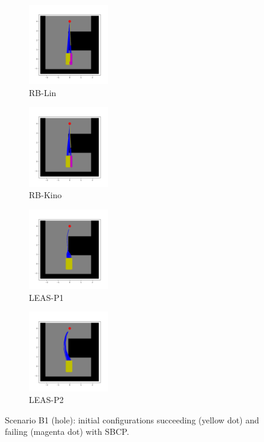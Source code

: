 \begin{figure}[ht]
    \captionsetup[subfigure]{justification=centering}
    \centering
    \begin{subfigure}[t]{0.4\linewidth}
        \includegraphics[width=\textwidth, height=3.5cm, trim={0cm 1cm 0cm 1cm},clip]{Figures/Chapter_CPSB/hole_Lin.png}
        \caption{RB-Lin}
    \end{subfigure}
    \begin{subfigure}[t]{0.4\linewidth}
        \includegraphics[width=\textwidth, height=3.5cm, trim={0cm 1cm 0cm 1cm},clip]{Figures/Chapter_CPSB/hole_Kino.png}
        \caption{RB-Kino}
    \end{subfigure}
    \begin{subfigure}[t]{0.4\linewidth}
        \includegraphics[width=\textwidth, height=3.5cm, trim={0cm 1cm 0cm 1cm},clip]{Figures/Chapter_CPSB/hole_LEAS-P1.png}
        \caption{LEAS-P1}
    \end{subfigure}
    \begin{subfigure}[t]{0.4\linewidth}
        \includegraphics[width=\textwidth, height=3.5cm, trim={0cm 1cm 0cm 1cm},clip]{Figures/Chapter_CPSB/hole_LEAS-P2.png}
        \caption{LEAS-P2}
    \end{subfigure}
    \caption{Scenario B1 (hole): initial configurations succeeding (yellow dot) and failing (magenta dot) with SBCP.}
    \label{fig:cp-sb:trajectories_hole}
\end{figure}


